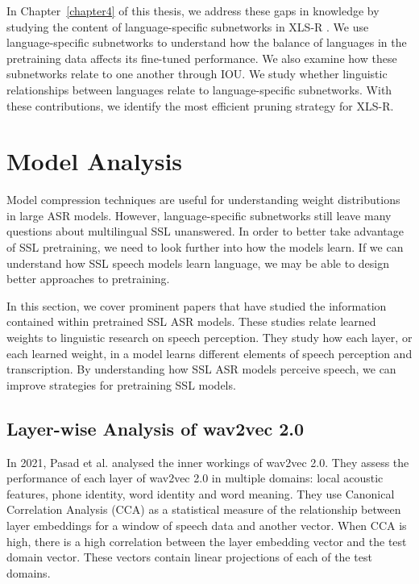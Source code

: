 In Chapter~\ref{chapter4} of this thesis, we address these gaps in knowledge by studying the content of language-specific subnetworks in XLS-R \cite{babu2021xlsr}. We use language-specific subnetworks to understand how the balance of languages in the pretraining data affects its fine-tuned performance. We also examine how these subnetworks relate to one another through IOU. We study whether linguistic relationships between languages relate to language-specific subnetworks. With these contributions, we identify the most efficient pruning strategy for XLS-R.


\section{Model Analysis}\label{lr_sec:model_analysis}
Model compression techniques are useful for understanding weight distributions in large ASR models. However, language-specific subnetworks still leave many questions about multilingual SSL unanswered. In order to better take advantage of SSL pretraining, we need to look further into how the models learn. If we can understand how SSL speech models learn language, we may be able to design better approaches to pretraining. 

In this section, we cover prominent papers that have studied the information contained within pretrained SSL ASR models. These studies relate learned weights to linguistic research on speech perception. They study how each layer, or each learned weight, in a model learns different elements of speech perception and transcription. By understanding how SSL ASR models perceive speech, we can improve strategies for pretraining SSL models.

\subsection{Layer-wise Analysis of wav2vec 2.0}
In 2021, Pasad et al. \cite{pasad2021layer} analysed the inner workings of wav2vec 2.0. They assess the performance of each layer of wav2vec 2.0 in multiple domains: local acoustic features, phone identity, word identity and word meaning. They use Canonical Correlation Analysis (CCA) as a statistical measure of the relationship between layer embeddings for a window of speech data and another vector. When CCA is high, there is a high correlation between the layer embedding vector and the test domain vector. These vectors contain linear projections of each of the test domains.

